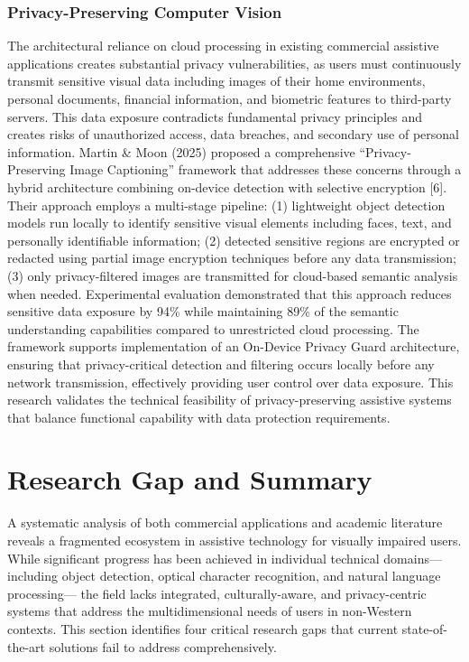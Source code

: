 \documentclass[a4paper]{report}
\begin{document}
\subsubsection{Privacy-Preserving Computer Vision}

The architectural reliance on cloud processing in existing commercial assistive applications creates substantial privacy vulnerabilities, as users must continuously transmit sensitive visual data including images of their home environments, personal documents, financial information, and biometric features to third-party servers. This data exposure contradicts fundamental privacy principles and creates risks of unauthorized access, data breaches, and secondary use of personal information. Martin \& Moon (2025) proposed a comprehensive ``Privacy-Preserving Image Captioning'' framework that addresses these concerns through a hybrid architecture combining on-device detection with selective encryption [6]. Their approach employs a multi-stage pipeline: (1) lightweight object detection models run locally to identify sensitive visual elements including faces, text, and personally identifiable information; (2) detected sensitive regions are encrypted or redacted using partial image encryption techniques before any data transmission; (3) only privacy-filtered images are transmitted for cloud-based semantic analysis when needed. Experimental evaluation demonstrated that this approach reduces sensitive data exposure by 94\% while maintaining 89\% of the semantic understanding capabilities compared to unrestricted cloud processing. The framework supports implementation of an On-Device Privacy Guard architecture, ensuring that privacy-critical detection and filtering occurs locally before any network transmission, effectively providing user control over data exposure. This research validates the technical feasibility of privacy-preserving assistive systems that balance functional capability with data protection requirements.

\section{Research Gap and Summary}

A systematic analysis of both commercial applications and academic literature reveals a fragmented ecosystem in assistive technology for visually impaired users. While significant progress has been achieved in individual technical domains---including object detection, optical character recognition, and natural language processing--- the field lacks integrated, culturally-aware, and privacy-centric systems that address the multidimensional needs of users in non-Western contexts. This section identifies four critical research gaps that current state-of-the-art solutions fail to address comprehensively.
\end{document}
